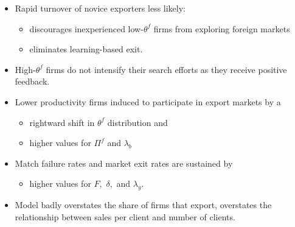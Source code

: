 \documentclass[notes=show]{beamer}
\begin{document}
\begin{frame}%



\begin{itemize}
\item Rapid turnover of novice exporters less likely:

\begin{itemize}
\item discourages inexperienced low-$\theta ^{f}$ firms from exploring
foreign markets

\item eliminates learning-based exit.
\end{itemize}

\item High-$\theta ^{f}$ firms do not intensify their search efforts as they
receive positive feedback.

\item Lower productivity firms induced to participate in export markets by a

\begin{itemize}
\item rightward shift in $\theta ^{f}$ distribution and

\item higher values for $\Pi ^{f}$ and $\lambda _{b}$
\end{itemize}

\item Match failure rates and market exit rates are sustained by

\begin{itemize}
\item higher values for $F,$ $\delta ,$ and $\lambda _{y}$.
\end{itemize}

\item Model badly overstates the share of firms that export, overstates the
relationship between sales per client and number of clients.
\end{itemize}

\end{frame}%
\end{document}
